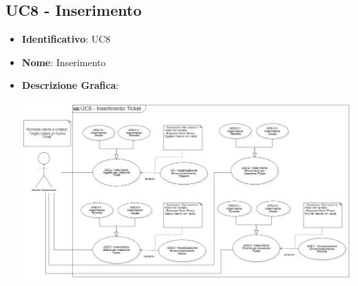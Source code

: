 \subsection{UC8 - Inserimento }
\begin{itemize}
	\item \textbf{Identificativo}: UC8
	\item \textbf{Nome}: Inserimento 
	\item\textbf{Descrizione Grafica}: 
	\begin{center}
		\includegraphics[scale=0.65]{images/UC8.png} 
	\end{center}


\end{itemize}
